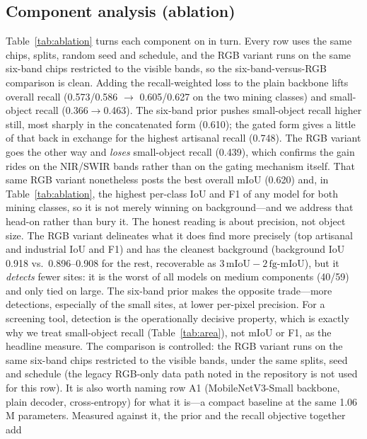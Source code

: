 \documentclass[review]{elsarticle}
\begin{document}
\subsection{Component analysis (ablation)}\label{sec:results-ablation}
Table~\ref{tab:ablation} turns each component on in turn. Every row uses the same chips,
splits, random seed and schedule, and the RGB variant runs on the same six-band chips
restricted to the visible bands, so the six-band-versus-RGB comparison is clean. Adding the
recall-weighted loss to the plain backbone lifts overall recall (\num{0.573}/\num{0.586}
$\rightarrow$ \num{0.605}/\num{0.627} on the two mining classes) and small-object recall
(\num{0.366}$\rightarrow$\num{0.463}). The six-band prior pushes small-object recall higher
still, most sharply in the concatenated form (\num{0.610}); the gated form gives a little of
that back in exchange for the highest artisanal recall (\num{0.748}). The RGB variant goes
the other way and \emph{loses} small-object recall (\num{0.439}), which confirms the gain
rides on the NIR/SWIR bands rather than on the gating mechanism itself. That same RGB variant
nonetheless posts the best overall mIoU (\num{0.620}) and, in Table~\ref{tab:ablation}, the
highest per-class IoU and F1 of any model for both mining classes, so it is not merely winning
on background---and we address that head-on rather than bury it. The honest reading is about
precision, not object size. The RGB variant delineates what it does find more precisely (top
artisanal and industrial IoU and F1) and has the cleanest background (background IoU
\num{0.918} vs.\ \num{0.896}--\num{0.908} for the rest, recoverable as
$3\,\mathrm{mIoU}-2\,\mathrm{fg\text{-}mIoU}$), but it \emph{detects} fewer sites: it is the
worst of all models on medium components (\num{40}/\num{59}) and only tied on large. The
six-band prior makes the opposite trade---more detections, especially of the small sites, at
lower per-pixel precision. For a screening tool, detection is the operationally decisive
property, which is exactly why we treat small-object recall (Table~\ref{tab:area}), not mIoU
or F1, as the headline measure. The comparison is
controlled: the RGB variant runs on the same six-band chips restricted to the visible bands,
under the same splits, seed and schedule (the legacy RGB-only data path noted in the
repository is not used for this row). It is also worth naming row A1 (MobileNetV3-Small
backbone, plain decoder, cross-entropy) for what it is---a compact baseline at the same
\num{1.06}\,M parameters. Measured against it, the prior and the recall objective together add
\end{document}

